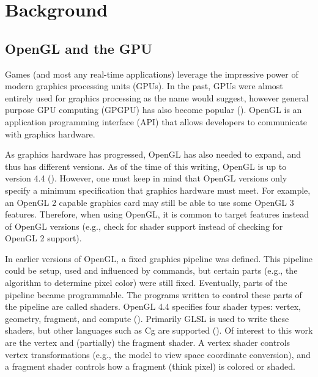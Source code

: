 \section{Background}

\subsection{OpenGL and the GPU}
Games (and most any real-time applications) leverage the impressive power of modern graphics processing units (GPUs).
In the past, GPUs were almost entirely used for graphics processing as the name would suggest, however general purpose GPU computing (GPGPU) has also become popular ().
OpenGL is an application programming interface (API) that allows developers to communicate with graphics hardware.

As graphics hardware has progressed, OpenGL has also needed to expand, and thus has different versions.
As of the time of this writing, OpenGL is up to version 4.4 ().
However, one must keep in mind that OpenGL versions only specify a minimum specification that graphics hardware must meet.
For example, an OpenGL 2 capable graphics card may still be able to use some OpenGL 3 features.
Therefore, when using OpenGL, it is common to target features instead of OpenGL versions (e.g., check for shader support instead of checking for OpenGL 2 support).

In earlier versions of OpenGL, a fixed graphics pipeline was defined.
This pipeline could be setup, used and influenced by commands, but certain parts (e.g., the algorithm to determine pixel color) were still fixed.
Eventually, parts of the pipeline became programmable.
The programs written to control these parts of the pipeline are called shaders.
OpenGL 4.4 specifies four shader types: vertex, geometry, fragment, and compute ().
Primarily GLSL is used to write these shaders, but other languages such as Cg are supported ().
Of interest to this work are the vertex and (partially) the fragment shader.
A vertex shader controls vertex transformations (e.g., the model to view space coordinate conversion), and a fragment shader controls how a fragment (think pixel) is colored or shaded.

